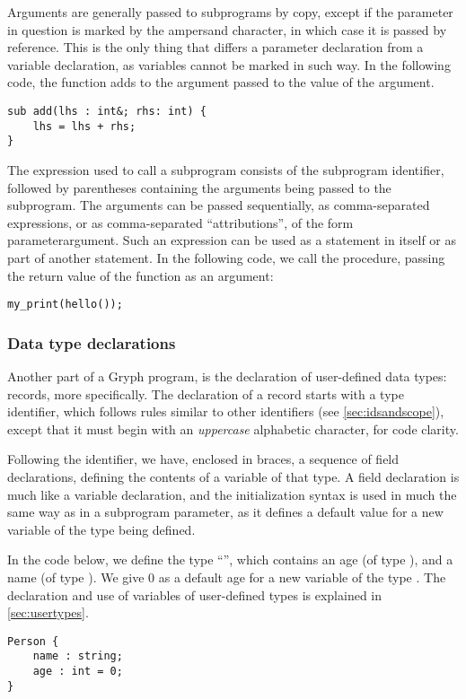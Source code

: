Arguments are generally passed to subprograms by copy, except if the parameter in question is marked by the ampersand character, in which case it is passed by reference. This is the only thing that differs a parameter declaration from a variable declaration, as variables cannot be marked in such way. In the following code, the function  adds to the argument passed to  the value of the  argument.
\begin{lstlisting}[language=Gryph]
sub add(lhs : int&; rhs: int) {
	lhs = lhs + rhs;
}
\end{lstlisting}

The expression used to call a subprogram consists of the subprogram identifier, followed by parentheses containing the arguments being passed to the subprogram. The arguments can be passed sequentially, as comma-separated expressions, or as comma-separated ``attributions'', of the form parameter\key{=}argument.
Such an expression can be used as a statement in itself or as part of another statement. In the following code, we call the  procedure, passing the return value of the  function as an argument:
\begin{lstlisting}[language=Gryph]
my_print(hello());
\end{lstlisting}

\subsubsection{Data type declarations}
\label{sec:typedecl}
Another part of a Gryph program, is the declaration of user-defined data types: records, more specifically. The declaration of a record starts with a type identifier, which follows rules similar to other identifiers (see \ref{sec:idsandscope}), except that it must begin with an \emph{uppercase} alphabetic character, for code clarity. 

Following the identifier, we have, enclosed in braces, a sequence of field declarations, defining the contents of a variable of that type. A field declaration is much like a variable declaration, and the initialization syntax is used in much the same way as in a subprogram parameter, as it defines a default value for a new variable of the type being defined.

In the code below, we define the type ``'', which contains an age (of type ), and a name (of type ). We give 0 as a default age for a new variable of the type . The declaration and use of variables of user-defined types is explained in \ref{sec:usertypes}.
\begin{lstlisting}[language=Gryph]
Person {
	name : string;
	age : int = 0;
}
\end{lstlisting}

